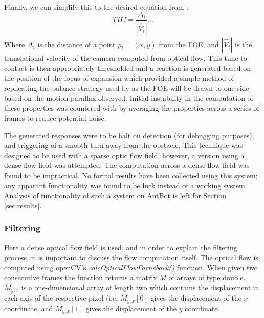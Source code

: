 \documentclass[a4paper,12pt]{article}
\begin{document}
Finally, we can simplify this to the desired equation from \cite{Souhila2007}:
\begin{equation}
TTC = \frac{\Delta_i}{|\vec{V}_t|} \dots
\end{equation}
Where $\Delta_i$ is the distance of a point $p_i = (x,y)$ from the FOE, and $|\vec{V}_t|$ is the
translational velocity of the camera computed from optical flow\cite{Souhila2007}. 
\newline
This time-to-contact is then appropriately thresholded and a reaction is generated based on the
position of the focus of expansion which provided a simple method of replicating the balance strategy
used by \cite{Souhila2007} as the FOE will be drawn to one side based on the motion parallax observed.
Initial instability in the computation of these properties was countered with by averaging the properties
across a series of frames to reduce potential noise.
\newline

The generated responses were to be halt on detection (for debugging purposes), and triggering of a
smooth turn away from the obstacle. This technique was designed to be used with a sparse optic flow
field, however, a version using a dense flow field was attempted. The computation across a dense
flow field was found to be impractical. No formal results have been collected using this system; any
apparant functionality was found to be luck instead of a working system. Analysis of functionality
of such a system on AntBot is left for Section \ref{sec:results}.


\subsubsection{Filtering}
Here a dense optical flow field is used, and in order to explain the filtering process, it is important
to discuss the flow computation itself. The optical flow is computed using openCV's
\textit{calcOpticalFlowFarneback()} function. When given two consecutive frames the function returns
a matrix $M$ of arrays of type double. $M_{y,x}$ is a one-dimensional array of length two which contains
the displacement in each axis of the respective pixel (i.e. $M_{y,x}[0]$ gives the displacement of the $x$
coordinate, and $M_{y,x}[1]$ gives the displacement of the $y$ coordinate.
\newline
\end{document}
